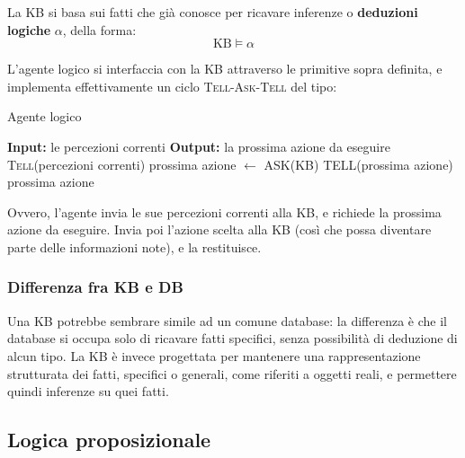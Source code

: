 \documentclass[a4paper,11pt]{article}
\begin{document}
La KB si basa sui fatti che già conosce per ricavare inferenze o \textbf{deduzioni logiche} $\alpha$, della forma:
$$ \text{KB} \models \alpha $$

L'agente logico si interfaccia con la KB attraverso le primitive sopra definita, e implementa effettivamente un ciclo \textsc{Tell}-\textsc{Ask}-\textsc{Tell} del tipo:

\begin{algorithm}
\caption{Agente logico}
\begin{algorithmic}
	\STATE \textbf{Input:} le percezioni correnti %
	\STATE \textbf{Output:} la prossima azione da eseguire %
	\STATE \textsc{Tell}(percezioni correnti)
	\STATE prossima azione $\leftarrow$ \textsc{ASK}(KB)
	\STATE \textsc{TELL}(prossima azione)
	\RETURN prossima azione
\end{algorithmic}
\end{algorithm}

Ovvero, l'agente invia le sue percezioni correnti alla KB, e richiede la prossima azione da eseguire.
Invia poi l'azione scelta alla KB (così che possa diventare parte delle informazioni note), e la restituisce.

\subsubsection{Differenza fra KB e DB}
Una KB potrebbe sembrare simile ad un comune database: la differenza è che il database si occupa solo di ricavare fatti specifici, senza possibilità di deduzione di alcun tipo.
La KB è invece progettata per mantenere una rappresentazione strutturata dei fatti, specifici o generali, come riferiti a oggetti reali, e permettere quindi inferenze su quei fatti. 

\subsection{Logica proposizionale}
\end{document}
